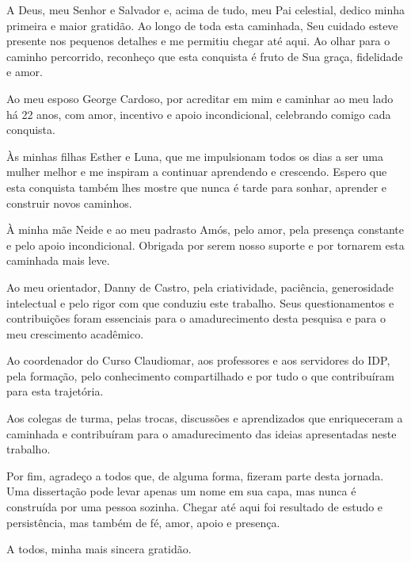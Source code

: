 
\begin{agradecimentos}

A Deus, meu Senhor e Salvador e, acima de tudo, meu Pai celestial, dedico minha primeira 
e maior gratidão. Ao longo de toda esta caminhada, Seu cuidado esteve presente nos pequenos 
detalhes e me permitiu chegar até aqui. Ao olhar para o caminho percorrido, reconheço que 
esta conquista é fruto de Sua graça, fidelidade e amor.

Ao meu esposo George Cardoso, por acreditar em mim e caminhar ao meu lado há 22 anos, com amor, incentivo e 
apoio incondicional, celebrando comigo cada conquista.

Às minhas filhas Esther e Luna, que me impulsionam todos os dias a ser uma mulher melhor e me 
inspiram a continuar aprendendo e crescendo. Espero que esta conquista também lhes mostre que 
nunca é tarde para sonhar, aprender e construir novos caminhos.

À minha mãe Neide e ao meu padrasto Amós, pelo amor, pela presença constante e pelo apoio 
incondicional. Obrigada por serem nosso suporte e por tornarem esta caminhada mais leve.

Ao meu orientador, Danny de Castro, pela criatividade, paciência, generosidade intelectual e 
pelo rigor com que conduziu este trabalho. Seus questionamentos e contribuições foram essenciais 
para o amadurecimento desta pesquisa e para o meu crescimento acadêmico.

Ao coordenador do Curso Claudiomar, aos professores e aos servidores do IDP, pela formação, 
pelo conhecimento compartilhado e por tudo o que contribuíram para esta trajetória.

Aos colegas de turma, pelas trocas, discussões e aprendizados que enriqueceram a caminhada e 
contribuíram para o amadurecimento das ideias apresentadas neste trabalho.

Por fim, agradeço a todos que, de alguma forma, fizeram parte desta jornada. Uma dissertação 
pode levar apenas um nome em sua capa, mas nunca é construída por uma pessoa sozinha. Chegar 
até aqui foi resultado de estudo e persistência, mas também de fé, amor, apoio e presença.

A todos, minha mais sincera gratidão.

\end{agradecimentos}
